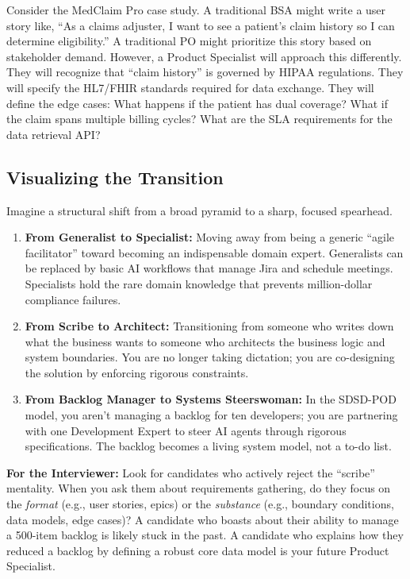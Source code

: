 \documentclass[
  11pt,
  openany,
  oneside]{book}
\providecommand{\tightlist}{%
  \setlength{\itemsep}{0pt}\setlength{\parskip}{0pt}}
\renewenvironment{quote}{\begin{customquote}}{\end{customquote}}
\begin{document}
Consider the MedClaim Pro case study. A traditional BSA might write a
user story like, ``As a claims adjuster, I want to see a patient's claim
history so I can determine eligibility.'' A traditional PO might
prioritize this story based on stakeholder demand. However, a Product
Specialist will approach this differently. They will recognize that
``claim history'' is governed by HIPAA regulations. They will specify
the HL7/FHIR standards required for data exchange. They will define the
edge cases: What happens if the patient has dual coverage? What if the
claim spans multiple billing cycles? What are the SLA requirements for
the data retrieval API?

\subsection{Visualizing the
Transition}\label{visualizing-the-transition}

Imagine a structural shift from a broad pyramid to a sharp, focused
spearhead.

\begin{enumerate}
\def\labelenumi{\arabic{enumi}.}
\tightlist
\item
  \textbf{From Generalist to Specialist:} Moving away from being a
  generic ``agile facilitator'' toward becoming an indispensable domain
  expert. Generalists can be replaced by basic AI workflows that manage
  Jira and schedule meetings. Specialists hold the rare domain knowledge
  that prevents million-dollar compliance failures.
\item
  \textbf{From Scribe to Architect:} Transitioning from someone who
  writes down what the business wants to someone who architects the
  business logic and system boundaries. You are no longer taking
  dictation; you are co-designing the solution by enforcing rigorous
  constraints.
\item
  \textbf{From Backlog Manager to Systems Steerswoman:} In the SDSD-POD
  model, you aren't managing a backlog for ten developers; you are
  partnering with one Development Expert to steer AI agents through
  rigorous specifications. The backlog becomes a living system model,
  not a to-do list.
\end{enumerate}

\begin{quote}
\textbf{For the Interviewer:} Look for candidates who actively reject
the ``scribe'' mentality. When you ask them about requirements
gathering, do they focus on the \emph{format} (e.g., user stories,
epics) or the \emph{substance} (e.g., boundary conditions, data models,
edge cases)? A candidate who boasts about their ability to manage a
500-item backlog is likely stuck in the past. A candidate who explains
how they reduced a backlog by defining a robust core data model is your
future Product Specialist.
\end{quote}
\end{document}
